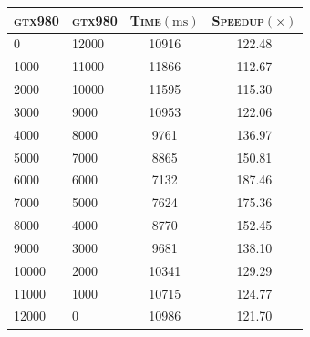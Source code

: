 \begin{table}[!htb]
\begin{subtable}{.5\linewidth}
\begin{tabular}{@{}LLCC@{}}
            \textsc{gtx980}& \textsc{gtx980} & \textsc{Time}$(\si{\milli\second})$ & \textsc{Speedup$(\times)$}  \\\midrule
        0     & 12000 & 10916 & 122.48 \\
        1000  & 11000 & 11866 & 112.67 \\
        2000  & 10000 & 11595 & 115.30 \\
        3000  & 9000  & 10953 & 122.06 \\
        4000  & 8000  & 9761  & 136.97 \\
        5000  & 7000  & 8865  & 150.81 \\
        6000  & 6000  & 7132  & 187.46 \\
        7000  & 5000  & 7624  & 175.36 \\
        8000  & 4000  & 8770  & 152.45 \\
        9000  & 3000  & 9681  & 138.10 \\
        10000 & 2000  & 10341 & 129.29 \\
        11000 & 1000  & 10715 & 124.77 \\
        12000 & 0     & 10986 & 121.70 \\
            \bottomrule
        \end{tabular}
    \end{subtable} 
\end{table}

